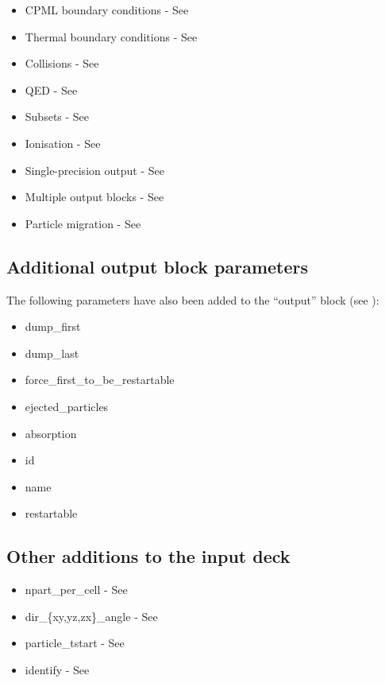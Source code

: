 \begin{itemize}
\item CPML boundary conditions - See 
\item Thermal boundary conditions - See 
\item Collisions - See 
\item QED - See 
\item Subsets - See 
\item Ionisation - See 
\item Single-precision output - See 
\item Multiple output blocks - See 
\item Particle migration - See 
\end{itemize}

\subsection{Additional output block parameters}

The following parameters have also been added to the ``output'' block
(see ):

\begin{itemize}
\item dump\_first
\item dump\_last
\item force\_first\_to\_be\_restartable
\item ejected\_particles
\item absorption
\item id
\item name
\item restartable
\end{itemize}

\subsection{Other additions to the input deck}

\begin{itemize}
\item npart\_per\_cell - See 
\item dir\_\{xy,yz,zx\}\_angle - See 
\item particle\_tstart - See 
\item identify - See 
\end{itemize}

